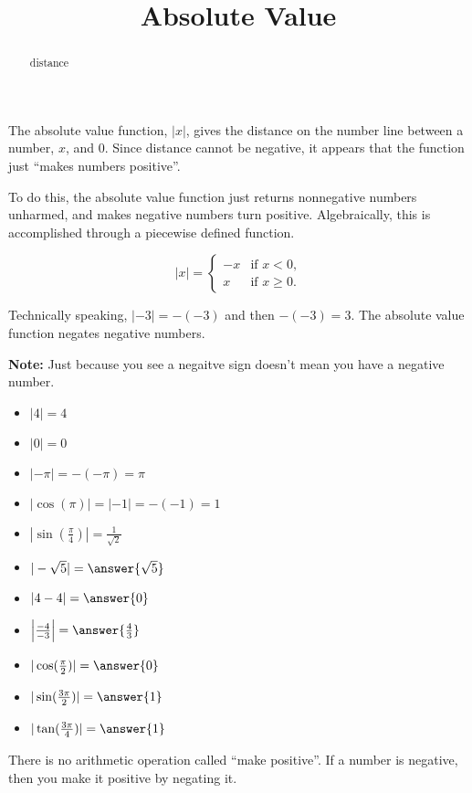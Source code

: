 \documentclass{ximera}
\title{Absolute Value}
\begin{document}
\begin{abstract}
distance
\end{abstract}
\maketitle



The absolute value function, $|x|$, gives the distance on the number line between a number, $x$, and $0$.  Since distance cannot be negative, it appears that the function just ``makes numbers positive''.


To do this, the absolute value function just returns nonnegative numbers unharmed, and makes negative numbers turn positive.  Algebraically, this is accomplished through a piecewise defined function.






\[
|x| = 
\begin{cases}
  -x &\text{if $x<0$,}\\
  x & \text{if $x\ge 0$}.
\end{cases}
\]


Technically speaking, $|-3| = -(-3)$ and then $-(-3) = 3$.  The absolute value function negates negative numbers.


\textbf{Note:} Just because you see a negaitve sign doesn't mean you have a negative number.



\begin{example}
\begin{itemize}
\item $|4| = 4$
\item $|0| = 0$
\item $|-\pi| = -(-\pi) = \pi$
\item $|\cos(\pi)| = |-1| = -(-1) = 1$
\item $|\sin(\tfrac{\pi}{4})| = \tfrac{1}{\sqrt{2}}$
\end{itemize}
\end{example}





\begin{example}
\begin{itemize}
\item $|-\sqrt{5}| = \answer{\sqrt{5}}$
\item $|4-4| = \answer{0}$
\item $\left|\frac{-4}{-3}\right| = \answer{\frac{4}{3}}$
\item $|\cos(\tfrac{\pi}{2})| = \answer{0}$
\item $|\sin(\tfrac{3\pi}{2})| = \answer{1}$
\item $|\tan(\tfrac{3\pi}{4})| = \answer{1}$
\end{itemize}
\end{example}
There is no arithmetic operation called ``make positive''.  If a number is negative, then you make it positive by negating it. 
\end{document}
